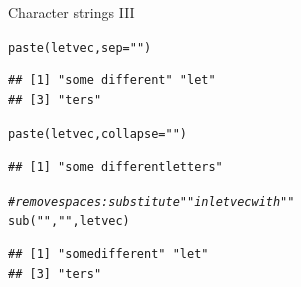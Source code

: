 \documentclass[xcolor=table,           xcolor=dvipsnames]{beamer}\usepackage[]{graphicx}\usepackage[]{color}
\makeatletter
\newcommand{\hlstr}[1]{\textcolor[rgb]{0.545,0.137,0.137}{#1}}
\newcommand{\hlcom}[1]{\textcolor[rgb]{0,0.392,0}{\textit{#1}}}
\newcommand{\hlstd}[1]{\textcolor[rgb]{0,0,0}{#1}}
\newcommand{\hlkwc}[1]{\textcolor[rgb]{1,0,1}{#1}}
\newcommand{\hlkwd}[1]{\textcolor[rgb]{0,0,1}{#1}}
\newenvironment{kframe}{%
 \def\at@end@of@kframe{}%
 \ifinner\ifhmode%
  \def\at@end@of@kframe{\end{minipage}}%
  \begin{minipage}{\columnwidth}%
 \fi\fi%
 \def\FrameCommand##1{\hskip\@totalleftmargin \hskip-\fboxsep
 \colorbox{shadecolor}{##1}\hskip-\fboxsep
     \hskip-\linewidth \hskip-\@totalleftmargin \hskip\columnwidth}%
 \MakeFramed {\advance\hsize-\width
   \@totalleftmargin\z@ \linewidth\hsize
   \@setminipage}}%
 {\par\unskip\endMakeFramed%
 \at@end@of@kframe}
\newenvironment{knitrout}{}{} %
\makeatother
\begin{document}
\begin{frame}[fragile]{Character strings III}
\begin{knitrout}
\color{fgcolor}\begin{kframe}
\begin{alltt}
\hlkwd{paste}\hlstd{(letvec,} \hlkwc{sep}\hlstd{=}\hlstr{""}\hlstd{)}
\end{alltt}
\begin{verbatim}
## [1] "some different" "let"           
## [3] "ters"
\end{verbatim}
\begin{alltt}
\hlkwd{paste}\hlstd{(letvec,} \hlkwc{collapse}\hlstd{=}\hlstr{""}\hlstd{)}
\end{alltt}
\begin{verbatim}
## [1] "some differentletters"
\end{verbatim}
\begin{alltt}
\hlcom{# remove spaces: substitute " " in letvec with ""}
\hlkwd{sub}\hlstd{(}\hlstr{" "}\hlstd{,} \hlstr{""}\hlstd{, letvec)}
\end{alltt}
\begin{verbatim}
## [1] "somedifferent" "let"          
## [3] "ters"
\end{verbatim}
\end{kframe}
\end{knitrout}
\end{frame}

\end{document}
